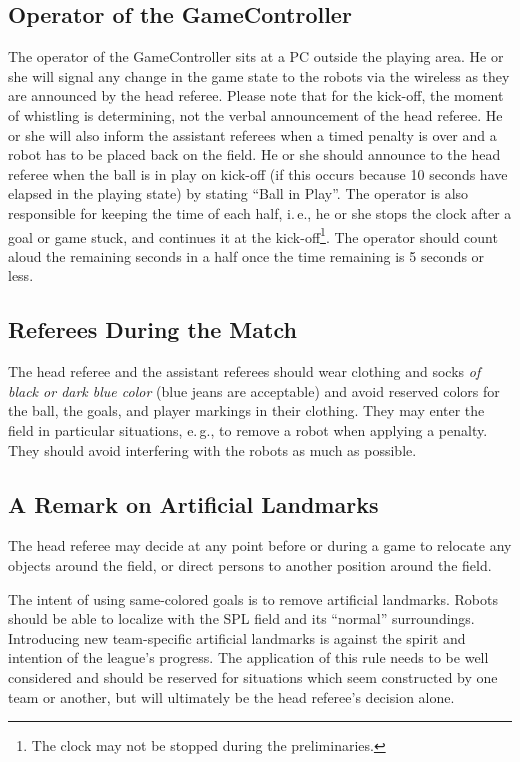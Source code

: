 \documentclass[12pt]{article}
\newcommand{\ie}{\mbox{i.\,e.}\xspace}
\newcommand{\eg}{\mbox{e.\,g.}\xspace}
\begin{document}
\subsection{Operator of the GameController}
\label{sec:gameControllerOp}
The operator of the GameController sits at a PC outside the playing area. He or she will signal any change in the game state to the robots via the wireless as they are announced by the head referee. Please note that for the kick-off, the moment of whistling is determining, not the verbal announcement of the head referee. He or she will also inform the assistant referees when a timed penalty is over and a robot has to be placed back on the field. He or she should announce to the head referee when the ball is in play on kick-off (if this occurs because 10 seconds have elapsed in the playing state) by stating ``Ball in Play''. The operator is also responsible for keeping the time of each half, \ie, he or she stops the clock after a goal or game stuck, and continues it at the kick-off\footnote{The clock may not be stopped during the preliminaries.}.  The operator should count aloud the remaining seconds in a half once the time remaining is 5 seconds or less.

\subsection{Referees During the Match}

The head referee and the assistant referees should wear clothing and socks \emph{of black or dark blue color} (blue jeans are acceptable) and avoid reserved colors for the ball, the goals, and player markings in their clothing. They may enter the field in particular situations, \eg, to remove a robot when applying a penalty. They should avoid interfering with the robots as much as possible.

\subsection{A Remark on Artificial Landmarks}
\label{sec:judgment:landmarks}

The head referee may decide at any point before or during a game to relocate any objects around the field, or direct persons to another position around the field.

The intent of using same-colored goals is to remove artificial landmarks.
Robots should be able to localize with the SPL field and its ``normal'' surroundings.
Introducing new team-specific artificial landmarks is against the spirit and intention of the league's progress.
The application of this rule needs to be well considered and should be reserved for situations which seem constructed by one team or another, but will ultimately be the head referee's decision alone.
\end{document}
